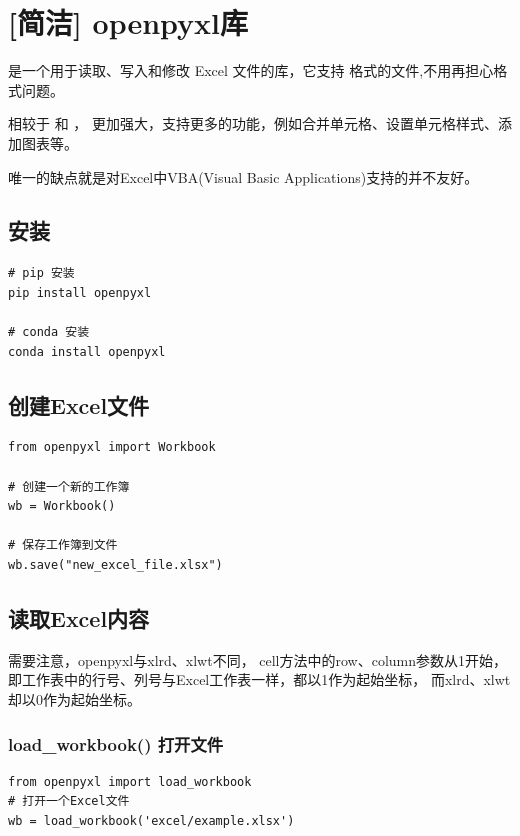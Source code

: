 \chapter{[简洁] openpyxl库}
\label{sec:openpyxl库}
 是一个用于读取、写入和修改 Excel 文件的库，它支持  格式的文件,不用再担心格式问题。

相较于  和 ， 更加强大，支持更多的功能，例如合并单元格、设置单元格样式、添加图表等。

唯一的缺点就是对Excel中VBA(Visual Basic Applications)支持的并不友好。

\section{安装}
\label{subsec:openpyxl安装}
\begin{lstlisting}[style=demostyle,numbers=none]
# pip 安装
pip install openpyxl

# conda 安装
conda install openpyxl
\end{lstlisting}

\section{创建Excel文件}
\begin{lstlisting}[style=demostyle,numbers=none]
from openpyxl import Workbook

# 创建一个新的工作簿
wb = Workbook()

# 保存工作簿到文件
wb.save("new_excel_file.xlsx")
\end{lstlisting}

\section{读取Excel内容}
\label{subsec:openpyxl读取Excel内容}
需要注意，openpyxl与xlrd、xlwt不同，
cell方法中的row、column参数从1开始， 
即工作表中的行号、列号与Excel工作表一样，都以1作为起始坐标，
而xlrd、xlwt却以0作为起始坐标。

\subsection{load\_workbook() 打开文件}
\begin{lstlisting}[style=demostyle,numbers=none]
from openpyxl import load_workbook    
# 打开一个Excel文件
wb = load_workbook('excel/example.xlsx')
\end{lstlisting}

